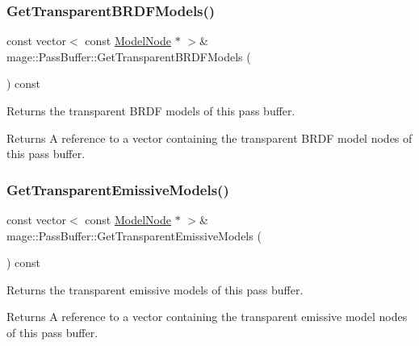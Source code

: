 \subsubsection{\texorpdfstring{Get\+Transparent\+B\+R\+D\+F\+Models()}{GetTransparentBRDFModels()}}
{\footnotesize\ttfamily const vector$<$ const \hyperlink{classmage_1_1_model_node}{Model\+Node} $\ast$ $>$\& mage\+::\+Pass\+Buffer\+::\+Get\+Transparent\+B\+R\+D\+F\+Models (\begin{DoxyParamCaption}{ }\end{DoxyParamCaption}) const\hspace{0.3cm}{\ttfamily [noexcept]}}

Returns the transparent B\+R\+DF models of this pass buffer.

\begin{DoxyReturn}{Returns}
A reference to a vector containing the transparent B\+R\+DF model nodes of this pass buffer. 
\end{DoxyReturn}
\hypertarget{structmage_1_1_pass_buffer_af51d15e8ec6230a6f17644ec2d1b6feb}{}\label{structmage_1_1_pass_buffer_af51d15e8ec6230a6f17644ec2d1b6feb} 
\subsubsection{\texorpdfstring{Get\+Transparent\+Emissive\+Models()}{GetTransparentEmissiveModels()}}
{\footnotesize\ttfamily const vector$<$ const \hyperlink{classmage_1_1_model_node}{Model\+Node} $\ast$ $>$\& mage\+::\+Pass\+Buffer\+::\+Get\+Transparent\+Emissive\+Models (\begin{DoxyParamCaption}{ }\end{DoxyParamCaption}) const\hspace{0.3cm}{\ttfamily [noexcept]}}

Returns the transparent emissive models of this pass buffer.

\begin{DoxyReturn}{Returns}
A reference to a vector containing the transparent emissive model nodes of this pass buffer. 
\end{DoxyReturn}
\hypertarget{structmage_1_1_pass_buffer_a8d0cc48dea7dfb6b710b6162b3a82b7e}{}\label{structmage_1_1_pass_buffer_a8d0cc48dea7dfb6b710b6162b3a82b7e} 

